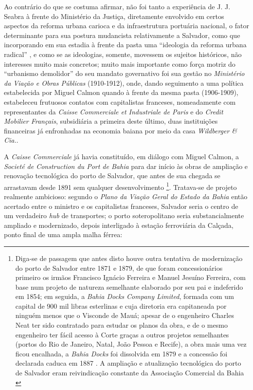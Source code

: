 Ao contrário do que se costuma afirmar, não foi tanto a experiência de J. J. Seabra à frente do Ministério da Justiça, diretamente envolvido em certos aspectos da reforma urbana carioca e da infraestrutura portuária nacional, o fator determinante para sua postura mudancista relativamente a Salvador, como que incorporando em sua estadia à frente da pasta uma ``ideologia da reforma urbana radical'' \cite{sampaio_formas_1999}, e como se as ideologias, somente, movessem os sujeitos históricos, não interesses muito mais concretos; muito mais importante como força motriz do ``urbanismo demolidor'' do seu mandato governativo foi sua gestão no \textit{Ministério da Viação e Obras Públicas} (1910-1912), onde, dando seguimento a uma política estabelecida por Miguel Calmon quando à frente da mesma pasta (1906-1909), estabeleceu frutuosos contatos com capitalistas franceses, nomeadamente com representantes da \textit{Caisse Commerciale et Industriale de Paris} e do \textit{Credit Mobilier Français}, subsidiária a primeira deste último, duas instituições financeiras já enfronhadas na economia baiana por meio da casa \textit{Wildberger \& Cia.}. 

A \textit{Caisse Commerciale} já havia constituído, em diálogo com Miguel Calmon, a \textit{Societé de Construction du Port de Bahia} para dar início às obras de ampliação e renovação tecnológica do porto de Salvador, que antes de sua chegada se arrastavam desde 1891 sem qualquer desenvolvimento \cite[p.~176-180]{rosado_porto_2016}\footnote{Diga-se de passagem que antes disto houve outra tentativa de modernização do porto de Salvador entre 1871 e 1879, de que foram concessionários primeiro os irmãos Francisco Ignácio Ferreira e Manuel Jesuíno Ferreira, com base num projeto de natureza semelhante elaborado por seu pai e indeferido em 1854; em seguida, a \textit{Bahia Docks Company Limited}, formada com um capital de 900 mil libras esterlinas e cuja diretoria era capitaneada por ninguém menos que o Visconde de Mauá; apesar de o engenheiro Charles Neat ter sido contratado para estudar os planos da obra, e de o mesmo engenheiro ter fácil acesso à Corte graças a outros projetos semelhantes (portos do Rio de Janeiro, Natal, João Pessoa e Recife), a obra mais uma vez ficou encalhada, a \textit{Bahia Docks} foi dissolvida em 1879 e a concessão foi declarada caduca em 1887 \cite[p.~175-176]{rosado_porto_2016}. A ampliação e atualização tecnológica do porto de Salvador eram reivindicação constante da Associação Comercial da Bahia \cite{CUNHA2011,joaci_porto_2016,rosado_porto_2016}}. Tratava-se de projeto realmente ambicioso: segundo o \textit{Plano da Viação Geral do Estado da Bahia} então acertado entre o ministro e os capitalistas franceses, Salvador seria o centro de um verdadeiro \textit{hub} de transportes; o porto soteropolitano seria substancialmente ampliado e modernizado, depois interligado à estação ferroviária da Calçada, ponto final de uma ampla malha férrea:

